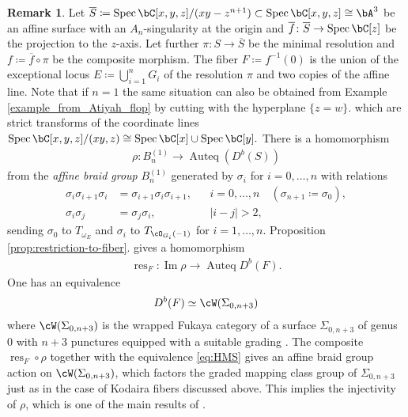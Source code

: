 \documentclass{amsart}
\numberwithin{equation}{section}
\theoremstyle{plain}
\theoremstyle{definition}
\newtheorem{remark}[theorem]{Remark}
\DeclareMathOperator{\Auteq}{\mathrm{Auteq}}
\DeclareMathOperator{\Image}{\mathrm{Im}}
\DeclareMathOperator{\Spec}{\mathrm{Spec}}
\DeclareMathOperator{\res}{\mathrm{res}}
\begin{document}
\begin{remark}
    Let
    $
        \overline{S} \coloneqq \Spec \bC[x,y,z]/(x y - z^{n+1})
        \subset \Spec \bC[x,y,z] \cong \bA^3
    $
    be an affine surface with an $A_n$-singularity at the origin
    and
    $
        \overline{f} \colon \overline{S} \to \Spec \bC[z]
    $
    be the projection to the $z$-axis.
    Let further
    $
        \pi \colon S \to \overline{S}
    $
    be the minimal resolution
    and
    $
        f \coloneqq \overline{f} \circ \pi
    $
    be the composite morphism.
    The fiber
    $
        F
        \coloneqq f^{-1}(0)
    $
    is the union
    of the exceptional locus
    $
        E \coloneqq \bigcup_{i=1}^n G_i
    $
    of the resolution $\pi$
    and two copies of the affine line.
    Note that if $n=1$ the same situation can also be obtained from Example \ref{example_from_Atiyah_flop} by cutting with the hyperplane $\{z=w\}$.
    which are strict transforms of the
    coordinate lines
    $
        \Spec \bC[x,y,z]/(xy, z)
        \cong \Spec \bC[x] \cup \Spec \bC[y].
    $
    There is a homomorphism
    \begin{align}
        \rho \colon B_n^{(1)} \to \Auteq(D^b(S))
    \end{align}
    from the \emph{affine braid group}
    $
        B_n^{(1)}
    $
    generated by $\sigma_i$ for $i=0,\ldots,n$
    with relations
    \begin{align}
        \sigma_i \sigma_{i+1} \sigma_i & = \sigma_{i+1} \sigma_i \sigma_{i+1}, &  & i = 0, \ldots, n \quad(\sigma_{n+1} \coloneqq \sigma_0), \\
        \sigma_i \sigma_j              & = \sigma_j \sigma_i,                  &  & |i-j|>2,
    \end{align}
    sending $\sigma_0$ to $T_{\omega_E}$
    and $\sigma_i$ to
    $
        T_{\cO_{G_i}(-1)}
    $
    for $i=1, \ldots, n$.
    Proposition \ref{prop:restriction-to-fiber}. gives
    a homomorphism
    \begin{align}
        \res_F \colon \Image \rho \to \Auteq D^b(F).
    \end{align}
    One has an equivalence
    \begin{align} \label{eq:HMS}
        D^b(F) \simeq \cW(\Sigma_{0,n+3})
    \end{align}
    where $\cW(\Sigma_{0,n+3})$
    is the wrapped Fukaya category of a surface $\Sigma_{0,n+3}$
    of genus 0 with $n+3$ punctures
    equipped with a suitable grading
    \cite{MR3735868, MR3830878}.
    The composite $\res_F \circ \rho$
    together with the equivalence \eqref{eq:HMS}
    gives an affine braid group action
    on $\cW(\Sigma_{0,n+3})$,
    which factors the graded mapping class group
    of $\Sigma_{0,n+3}$
    just as in the case of Kodaira fibers discussed above.
    This implies the injectivity of $\rho$,
    which is one of the main results of
    \cite{MR2629510}.
\end{remark}


\printbibliography
\end{document}
